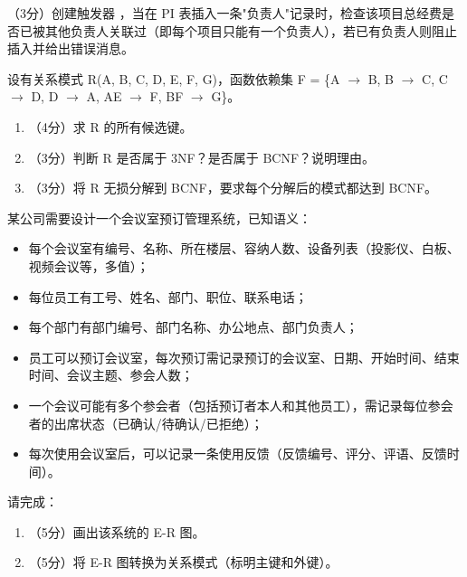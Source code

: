 \documentclass[a4paper,11pt]{article}
\begin{document}
\q （3分）创建触发器 ，当在 PI 表插入一条"负责人"记录时，检查该项目总经费是否已被其他负责人关联过（即每个项目只能有一个负责人），若已有负责人则阻止插入并给出错误消息。
\anslines{1.5cm}


\q 设有关系模式 R(A, B, C, D, E, F, G)，函数依赖集 F = \{A $\rightarrow$ B, B $\rightarrow$ C, C $\rightarrow$ D, D $\rightarrow$ A, AE $\rightarrow$ F, BF $\rightarrow$ G\}。

\begin{enumerate}[leftmargin=2em, itemsep=3pt]
  \item[（1）] （4分）求 R 的所有候选键。
  \item[（2）] （3分）判断 R 是否属于 3NF？是否属于 BCNF？说明理由。
  \item[（3）] （3分）将 R 无损分解到 BCNF，要求每个分解后的模式都达到 BCNF。
\end{enumerate}

\anslines{4cm}


\q 某公司需要设计一个会议室预订管理系统，已知语义：
\begin{itemize}
  \item 每个会议室有编号、名称、所在楼层、容纳人数、设备列表（投影仪、白板、视频会议等，多值）；
  \item 每位员工有工号、姓名、部门、职位、联系电话；
  \item 每个部门有部门编号、部门名称、办公地点、部门负责人；
  \item 员工可以预订会议室，每次预订需记录预订的会议室、日期、开始时间、结束时间、会议主题、参会人数；
  \item 一个会议可能有多个参会者（包括预订者本人和其他员工），需记录每位参会者的出席状态（已确认/待确认/已拒绝）；
  \item 每次使用会议室后，可以记录一条使用反馈（反馈编号、评分、评语、反馈时间）。
\end{itemize}
请完成：
\begin{enumerate}[leftmargin=2em, itemsep=3pt]
  \item[（1）] （5分）画出该系统的 E-R 图。
  \item[（2）] （5分）将 E-R 图转换为关系模式（标明主键和外键）。
\end{enumerate}

\anslines{4.5cm}
\end{document}
